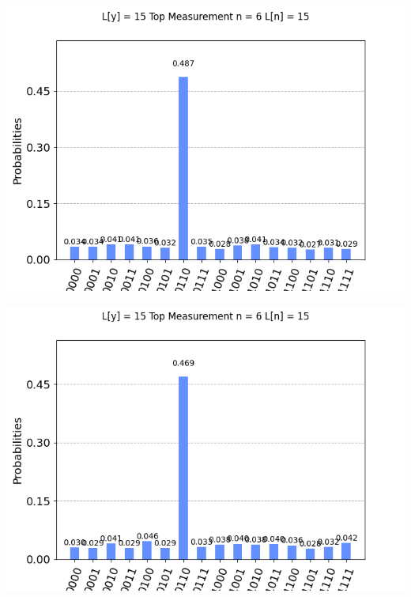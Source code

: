 \documentclass[11pt]{article}
\begin{document}
\begin{center}
\includegraphics[width=\textwidth]{failed_logical_3.png}

\includegraphics[width=\textwidth]{failed_logical_4.png}
\end{center}
\end{document}
